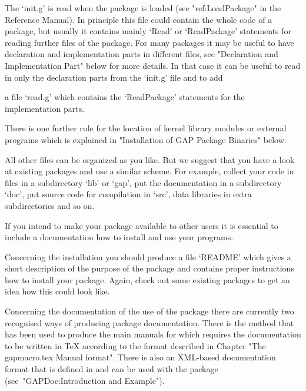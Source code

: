 The   `init.g'   is   read   when   the   package   is   loaded   (see
"ref:LoadPackage" in the {\GAP} Reference Manual).
In principle  this file  could contain  the whole
{\GAP} code  of a package,  but usually  it contains mainly  `Read' or
`ReadPackage' statements for reading further files of the package. For
many packages it may be  useful to have declaration and implementation
parts in  different files,  see "Declaration and  Implementation Part"
below for more details. In that case  it can be useful to read in only
the declaration parts from the `init.g' file and to add 

a file  `read.g' which contains  the `ReadPackage' statements  for the
implementation parts.

There is one  further rule for the location of  kernel library modules
or  external  programs which  is  explained  in "Installation  of  GAP
Package Binaries" below.

All other files can be organized as  you like. But we suggest that you
have  a look  at  existing  packages and  use  a  similar scheme.  For
example, collect your {\GAP} code in  files in a subdirectory `lib' or
`gap', put the documentation in  a subdirectory `doc', put source code
for compilation in  `src', data libraries in  extra subdirectories and
so on.




If you  intend to  make your  package available to  other users  it is
essential  to include  a documentation  how  to install  and use  your
programs.

Concerning the installation  you should produce a  file `README' which
gives a short  description of the purpose of the  package and contains
proper instructions how to install your package. Again, check out some
existing packages to get an idea how this could look like.

Concerning  the  documentation  of  the   use  of  the  package  there
are  currently  two  recognised   ways  of  producing  {\GAP}  package
documentation. There is  the method that has been used  to produce the
main  manuals  for  {\GAP}  which requires  the  documentation  to  be
written in  {\TeX} according to  the format described in  Chapter "The
gapmacro.tex Manual format". There  is also an XML-based documentation
format that  is defined in and  can be used with  the 
package (see~"GAPDoc:Introduction and Example").

